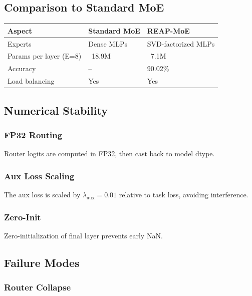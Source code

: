 \subsection{Comparison to Standard MoE}

\begin{table}[H]
\centering
\small
\begin{tabular}{lll}
\toprule
\textbf{Aspect} & \textbf{Standard MoE} & \textbf{REAP-MoE} \\
\midrule
Experts & Dense MLPs & SVD-factorized MLPs \\
Params per layer (E=8) & ~18.9M & ~7.1M \\
Accuracy & -- & 90.02\% \\
Load balancing & Yes & Yes \\
\bottomrule
\end{tabular}
\end{table}

\subsection{Numerical Stability}

\subsubsection{FP32 Routing}

Router logits are computed in FP32, then cast back to model dtype.

\subsubsection{Aux Loss Scaling}

The aux loss is scaled by $\lambda_\text{aux} = 0.01$ relative to task loss, 
avoiding interference.

\subsubsection{Zero-Init}

Zero-initialization of final layer prevents early NaN.

\subsection{Failure Modes}

\subsubsection{Router Collapse}

